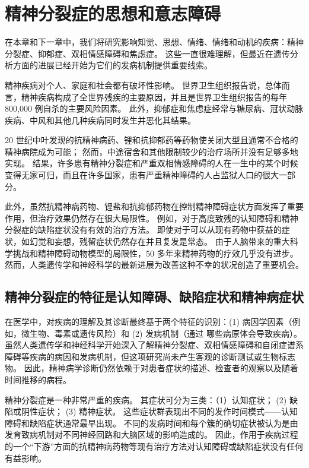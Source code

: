 \chapter{精神分裂症的思想和意志障碍}

在本章和下一章中，我们将研究影响知觉、思想、情绪、情绪和动机的疾病：精神分裂症、抑郁症、双相情感障碍和焦虑症。 这些一直很难理解，但最近在遗传分析方面的进展已经开始为它们的发病机制提供重要线索。

精神疾病对个人、家庭和社会都有破坏性影响。 世界卫生组织报告说，总体而言，精神疾病构成了全世界残疾的主要原因，并且是世界卫生组织报告的每年 800,000 例自杀的主要风险因素。 此外，抑郁症和焦虑症经常与糖尿病、冠状动脉疾病、中风和其他几种疾病同时发生并恶化其结果。

20 世纪中叶发现的抗精神病药、锂和抗抑郁药等药物使关闭大型且通常不合格的精神病院成为可能； 然而，中途宿舍和其他限制较少的治疗场所并没有足够多地实现。 结果，许多患有精神分裂症和严重双相情感障碍的人在一生中的某个时候变得无家可归，而且在许多国家，患有严重精神障碍的人占监狱人口的很大一部分。

此外，虽然抗精神病药物、锂盐和抗抑郁药物在控制精神障碍症状方面发挥了重要作用，但治疗效果仍然存在很大局限性。 例如，对于高度致残的认知障碍和精神分裂症的缺陷症状没有有效的治疗方法。 即使对于可以从现有药物中获益的症状，如幻觉和妄想，残留症状仍然存在并且复发是常态。 由于人脑带来的重大科学挑战和精神障碍动物模型的局限性，50 多年来精神药物的疗效几乎没有进步。 然而，人类遗传学和神经科学的最新进展为改善这种不幸的状况创造了重要机会。

\section{精神分裂症的特征是认知障碍、缺陷症状和精神病症状}
在医学中，对疾病的理解及其诊断最终基于两个特征的识别：(1) 病因学因素（例如，微生物、毒素或遗传风险）和 (2) 发病机制（通过 哪些病原体会导致疾病）。 虽然人类遗传学和神经科学开始深入了解精神分裂症、双相情感障碍和自闭症谱系障碍等疾病的病因和发病机制，但这项研究尚未产生客观的诊断测试或生物标志物。 因此，精神病学诊断仍然依赖于对患者症状的描述、检查者的观察以及随着时间推移的病程。

精神分裂症是一种非常严重的疾病。 其症状可分为三类：（1）认知症状； (2) 缺陷或阴性症状； (3) 精神症状。 这些症状群表现出不同的发作时间模式——认知障碍和缺陷症状通常最早出现。 不同的发病时间和每个簇的确切症状被认为是由发育致病机制对不同神经回路和大脑区域的影响造成的。 因此，作用于疾病过程的一个“下游”方面的抗精神病药物等现有治疗方法对认知障碍或缺陷症状没有任何有益影响。

